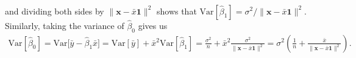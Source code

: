 \documentclass[10pt]{article}
\begin{document}
\begin{itemize}
\begin{align*}
    \end{align*}
    and dividing both sides by \(\|\mathbf{x} - \bar{x}\mathbf{1}\|^2\) shows that 
    \(\mathrm{Var}[\hat{\beta}_1] = \sigma^2 / \|\mathbf{x} - \bar{x}\mathbf{1}\|^2\). 
    Similarly, taking the variance of \(\hat{\beta}_0\) gives us 
    \begin{align*}
        \mathrm{Var}[\hat{\beta}_0] = \mathrm{Var} \big[ \bar{y} - \hat{\beta}_1 \bar{x} \big]
        = \mathrm{Var}[\bar{y}] + \bar{x}^2 \mathrm{Var}[\hat{\beta}_1]
        = \frac{\sigma^2}{n} + \bar{x}^2\frac{\sigma^2}{\|\mathbf{x} - \bar{x}\mathbf{1}\|^2}
        = \sigma^2 \left( \frac{1}{n} + \frac{\bar{x}}{\|\mathbf{x} - \bar{x}\mathbf{1}\|^2} \right).
    \end{align*}
\end{itemize}

\end{document}
